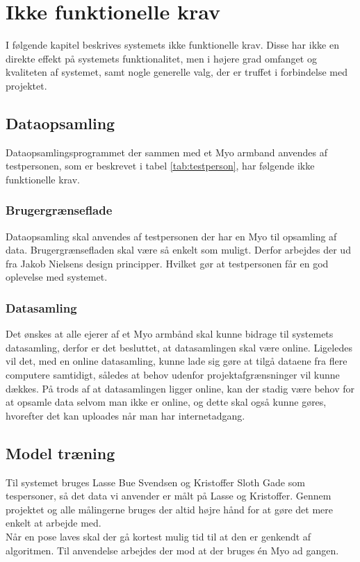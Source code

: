 \thispagestyle{fancy}
\chapter{Ikke funktionelle krav}
I følgende kapitel beskrives systemets ikke funktionelle krav. Disse har ikke en direkte effekt på systemets funktionalitet, men i højere grad omfanget og kvaliteten af systemet, samt nogle generelle valg, der er truffet i forbindelse med projektet.

\section{Dataopsamling}
Dataopsamlingsprogrammet der sammen med et Myo armband anvendes af testpersonen, som er beskrevet i tabel \ref{tab:testperson}, har følgende ikke funktionelle krav.

\subsection{Brugergrænseflade}
Dataopsamling skal anvendes af testpersonen der har en Myo til opsamling af data. Brugergrænsefladen skal være så enkelt som muligt.  Derfor arbejdes der ud fra Jakob Nielsens design principper. Hvilket gør at testpersonen får en god oplevelse med systemet.

\subsection{Datasamling}
Det ønskes at alle ejerer af et Myo armbånd skal kunne bidrage til systemets datasamling, derfor er det besluttet, at datasamlingen skal være online. Ligeledes vil det, med en online datasamling, kunne lade sig gøre at tilgå dataene fra flere computere samtidigt, således at behov udenfor projektafgrænsninger vil kunne dækkes. På trods af at datasamlingen ligger online, kan der stadig være behov for at opsamle data selvom man ikke er online, og dette skal også kunne gøres, hvorefter det kan uploades når man har internetadgang.

\section{Model træning}
Til systemet bruges Lasse Bue Svendsen og Kristoffer Sloth Gade som tespersoner, så det data vi anvender er målt på Lasse og Kristoffer. Gennem projektet og alle målingerne bruges der altid højre hånd for at gøre det mere enkelt at arbejde med.\\
Når en pose laves skal der gå kortest mulig tid til at den er genkendt af algoritmen. Til anvendelse arbejdes der mod at der bruges én Myo ad gangen.


